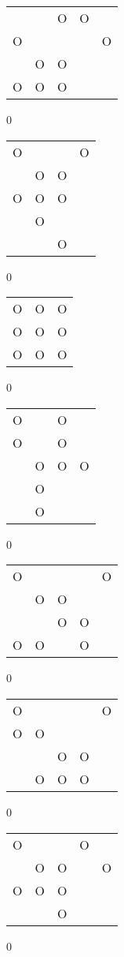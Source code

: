 \begin{tabular}{|m{0.2cm}m{0.2cm}m{0.2cm}m{0.2cm}m{0.2cm}|}\hline
 & &O&O& \\
O& & & &O\\
 &O&O& & \\
O&O&O& & \\
\hline\end{tabular}0
\begin{tabular}{|m{0.2cm}m{0.2cm}m{0.2cm}m{0.2cm}|}\hline
O& & &O\\
 &O&O& \\
O&O&O& \\
 &O& & \\
 & &O& \\
\hline\end{tabular}0
\begin{tabular}{|m{0.2cm}m{0.2cm}m{0.2cm}|}\hline
O&O&O\\
O&O&O\\
O&O&O\\
\hline\end{tabular}0
\begin{tabular}{|m{0.2cm}m{0.2cm}m{0.2cm}m{0.2cm}|}\hline
O& &O& \\
O& &O& \\
 &O&O&O\\
 &O& & \\
 &O& & \\
\hline\end{tabular}0
\begin{tabular}{|m{0.2cm}m{0.2cm}m{0.2cm}m{0.2cm}m{0.2cm}|}\hline
O& & & &O\\
 &O&O& & \\
 & &O&O& \\
O&O& &O& \\
\hline\end{tabular}0
\begin{tabular}{|m{0.2cm}m{0.2cm}m{0.2cm}m{0.2cm}m{0.2cm}|}\hline
O& & & &O\\
O&O& & & \\
 & &O&O& \\
 &O&O&O& \\
\hline\end{tabular}0
\begin{tabular}{|m{0.2cm}m{0.2cm}m{0.2cm}m{0.2cm}m{0.2cm}|}\hline
O& & &O& \\
 &O&O& &O\\
O&O&O& & \\
 & &O& & \\
\hline\end{tabular}0
